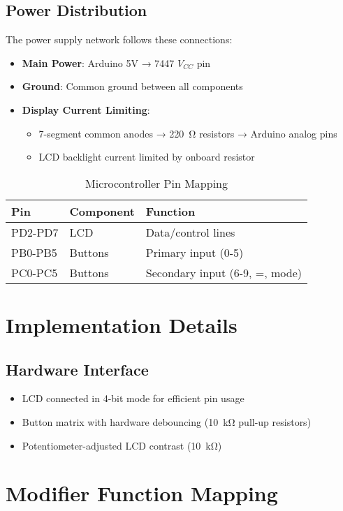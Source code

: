 \documentclass[journal]{IEEEtran}
\begin{document}
\subsection{Power Distribution}
The power supply network follows these connections:
\begin{itemize}
    \item \textbf{Main Power}: Arduino 5V → 7447 $V_{CC}$ pin
    \item \textbf{Ground}: Common ground between all components
    \item \textbf{Display Current Limiting}: 
    \begin{itemize}
        \item 7-segment common anodes → \SI{220}{\ohm} resistors → Arduino analog pins
        \item LCD backlight current limited by onboard resistor
    \end{itemize}
\end{itemize}
\begin{table}[h!]
\centering
\caption{Microcontroller Pin Mapping}
\begin{tabular}{|l|l|l|}
\hline
\textbf{Pin} & \textbf{Component} & \textbf{Function} \\
\hline
PD2-PD7 & LCD & Data/control lines \\
PB0-PB5 & Buttons & Primary input (0-5) \\
PC0-PC5 & Buttons & Secondary input (6-9, =, mode) \\
\hline
\end{tabular}
\end{table}

\section{Implementation Details}
\subsection{Hardware Interface}
\begin{itemize}
    \item LCD connected in 4-bit mode for efficient pin usage
    \item Button matrix with hardware debouncing (\SI{10}{\kilo\ohm} pull-up resistors)
    \item Potentiometer-adjusted LCD contrast (\SI{10}{\kilo\ohm})
\end{itemize}

\section{Modifier Function Mapping}
\end{document}
